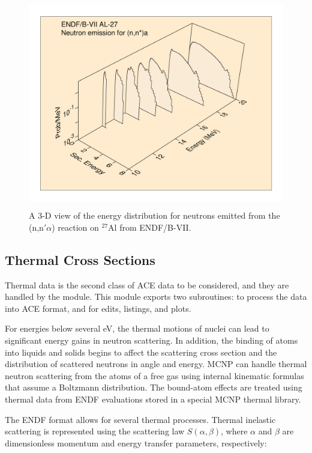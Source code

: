 \begin{figure}[t]\centering
\includegraphics[keepaspectratio, height=3.6in, angle=0]{figs/acer2ack}
\caption[Neutron energy distributions from $^{27}$Al(n,n'$\alpha$)
 reaction]{A 3-D
 view of the energy distribution for neutrons emitted from the (n,n$'\alpha$)
 reaction on $^{27}$Al from ENDF/B-VII.}
\label{dist3d}
\end{figure}

\subsection{Thermal Cross Sections}
\label{ssACER_t}

Thermal data is the second class of ACE data to be considered,
and they are handled by the 
module.  This module exports two subroutines:
 to process the data into
ACE format, and  for edits,
listings, and plots.

For energies below several eV, the thermal motions of nuclei can
lead to significant energy gains in neutron scattering.  In addition,
the binding of atoms into liquids and solids begins to affect the
scattering cross section and the distribution of scattered neutrons
in angle and energy.  MCNP can handle thermal neutron scattering
from the atoms of a free gas using internal
kinematic formulas that assume a Boltzmann distribution.
The bound-atom effects are treated using thermal data from ENDF
evaluations stored in a special MCNP thermal library.

The ENDF format allows for several thermal processes.  Thermal
inelastic scattering is represented using
the scattering law $S(\alpha,\beta)$, where
$\alpha$ and $\beta$ are dimensionless momentum and energy transfer
parameters, respectively:

